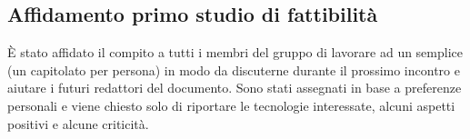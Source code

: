 \subsection{Affidamento primo studio di fattibilità}
È stato affidato il compito a tutti i membri del gruppo di lavorare ad un semplice \SdF{} (un capitolato per persona) in modo da discuterne durante il prossimo incontro e aiutare i futuri redattori del documento. Sono stati assegnati in base a preferenze personali e viene chiesto solo di riportare le tecnologie interessate, alcuni aspetti positivi e alcune criticità.